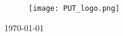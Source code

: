 \begin{titlepage}

\begin{figure}[h]
\centering
\texttt{[image: PUT\_logo.png]}\\[1cm] %
\end{figure}


{\large \today}\\[1cm] %

 

\vfill %

\end{titlepage}
